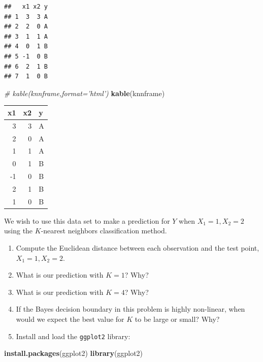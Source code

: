 \documentclass[]{article}
\newenvironment{Shaded}{\begin{snugshade}}{\end{snugshade}}
\newcommand{\CommentTok}[1]{\textcolor[rgb]{0.56,0.35,0.01}{\textit{#1}}}
\newcommand{\KeywordTok}[1]{\textcolor[rgb]{0.13,0.29,0.53}{\textbf{#1}}}
\newcommand{\NormalTok}[1]{#1}
\providecommand{\tightlist}{%
  \setlength{\itemsep}{0pt}\setlength{\parskip}{0pt}}
\begin{document}
\begin{verbatim}
##   x1 x2 y
## 1  3  3 A
## 2  2  0 A
## 3  1  1 A
## 4  0  1 B
## 5 -1  0 B
## 6  2  1 B
## 7  1  0 B
\end{verbatim}

\begin{Shaded}
\begin{Highlighting}[]
\CommentTok{# kable(knnframe,format='html')}
\KeywordTok{kable}\NormalTok{(knnframe)}
\end{Highlighting}
\end{Shaded}

\begin{tabular}{r|r|l}
\hline
x1 & x2 & y\\
\hline
3 & 3 & A\\
\hline
2 & 0 & A\\
\hline
1 & 1 & A\\
\hline
0 & 1 & B\\
\hline
-1 & 0 & B\\
\hline
2 & 1 & B\\
\hline
1 & 0 & B\\
\hline
\end{tabular}

We wish to use this data set to make a prediction for \(Y\) when
\(X_1=1, X_2=2\) using the \(K\)-nearest neighbors classification
method.

\begin{enumerate}
\def\labelenumi{\alph{enumi}.}
\tightlist
\item
  Compute the Euclidean distance between each observation and the test
  point, \(X_1=1,X_2=2\).
\item
  What is our prediction with \(K=1\)? Why?
\item
  What is our prediction with \(K=4\)? Why?
\item
  If the Bayes decision boundary in this problem is highly non-linear,
  when would we expect the best value for \(K\) to be large or small?
  Why?
\item
  Install and load the \texttt{ggplot2} library:
\end{enumerate}

\begin{Shaded}
\begin{Highlighting}[]
\KeywordTok{install.packages}\NormalTok{(ggplot2)}
\KeywordTok{library}\NormalTok{(ggplot2)}
\end{Highlighting}
\end{Shaded}
\end{document}
